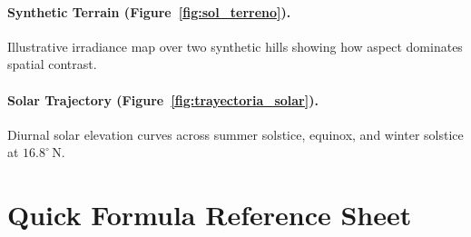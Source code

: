\documentclass[11pt,a4paper]{article}
\begin{document}
\paragraph{Synthetic Terrain (Figure~\ref{fig:sol_terreno}).} Illustrative irradiance map over two synthetic hills showing how aspect dominates spatial contrast.

\paragraph{Solar Trajectory (Figure~\ref{fig:trayectoria_solar}).} Diurnal solar elevation curves across summer solstice, equinox, and winter solstice at $16.8^\circ$\,N.


\section{Quick Formula Reference Sheet}
\label{sec:formulas}
\end{document}
